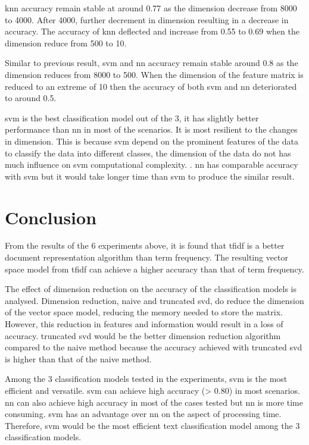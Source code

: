 \Ac{knn} accuracy remain stable at around 0.77 as the dimension decrease from 8000 to 4000. After 4000, further decrement in dimension resulting in a decrease in accuracy. The accuracy of \ac{knn} deflected and increase from 0.55 to 0.69 when the dimension reduce from 500 to 10.

Similar to previous result, \ac{svm} and \ac{nn} accuracy remain stable around 0.8 as the dimension reduces from 8000 to 500. When the dimension of the feature matrix is reduced to an extreme of 10 then the accuracy of both \ac{svm} and \ac{nn} deteriorated to around 0.5.

\Ac{svm} is the best classification model out of the 3, it has slightly better performance than \ac{nn} in most of the scenarios. It is most resilient to the changes in dimension. This is because \ac{svm} depend on the prominent features of the data to classify the data into different classes, the dimension of the data do not has much influence on \ac{svm} computational complexity. \cite{dimRedCat}. \Ac{nn} has comparable accuracy with \ac{svm} but it would take longer time than \ac{svm} to produce the similar result.

\clearpage
\section{Conclusion}
From the results of the 6 experiments above, it is found that \ac{tfidf} is a better document representation algorithm than term frequency. The resulting vector space model from \ac{tfidf} can achieve a higher accuracy than that of term frequency. 

The effect of dimension reduction on the accuracy of the classification models is analysed. Dimension reduction, naive and truncated \ac{svd}, do reduce the dimension of the vector space model, reducing the memory needed to store the matrix. However, this reduction in features and information would result in a loss of accuracy. truncated \ac{svd} would be the better dimension reduction algorithm compared to the naive method because the accuracy achieved with truncated \ac{svd} is higher than that of the naive method.

Among the 3 classification models tested in the experiments, \ac{svm} is the most efficient and versatile. \Ac{svm} can achieve high accuracy (> 0.80) in most scenarios. \Ac{nn} can also achieve high accuracy in most of the cases tested but \ac{nn} is more time consuming. \Ac{svm} has an advantage over \ac{nn} on the aspect of processing time. Therefore, \ac{svm} would be the most efficient text classification model among the 3 classification models.

